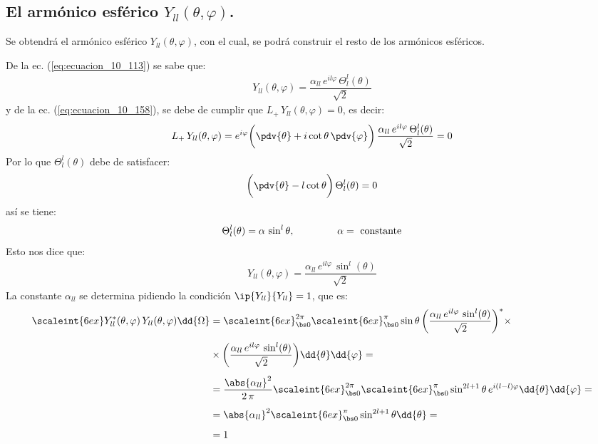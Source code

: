 \subsection{El armónico esférico \texorpdfstring{$Y_{ll} (\theta, \varphi)$}{Yll (t, f)}.}

Se obtendrá el armónico esférico $Y_{ll} (\theta, \varphi)$, con el cual, se podrá construir el resto de los armónicos esféricos.
\par
De la ec. (\ref{eq:ecuacion_10_113}) se sabe que:
\begin{align}
Y_{l l} (\theta, \varphi) = \dfrac{\alpha_{l l} \, e^{i l \varphi} \, \Theta_{l}^{l} (\theta)}{\sqrt{2}}
\label{eq:ecuacion_10_161}
\end{align}
y de la ec. (\ref{eq:ecuacion_10_158}), se debe de cumplir que $L_{+} \, Y_{l l} (\theta, \varphi) = 0$, es decir:
\begin{align}
L_{+} \, Y_{l l} (\theta, \varphi) = e^{i \varphi} \bigg( \pdv{\theta} + i \cot \theta \, \pdv{\varphi} \bigg) \, \dfrac{\alpha_{l l} \, e^{i l \varphi} \, \Theta_{l}^{l} (\theta)}{\sqrt{2}} = 0
\label{eq:ecuacion_10_162}
\end{align}
Por lo que $\Theta_{l}^{l} (\theta)$ debe de satisfacer:
\begin{align}
\bigg( \pdv{\theta} - l \cot \theta \bigg) \, \Theta_{l}^{l} (\theta) = 0
\label{eq:ecuacion_10_163}
\end{align}
así se tiene:
\begin{align}
\Theta_{l}^{l} (\theta) = \alpha \, \sin^{l} \theta, \hspace{1.5cm} \alpha = \mbox{ constante}
\label{eq:ecuacion_10_164}
\end{align}
Esto nos dice que:
\begin{align}
Y_{l l} (\theta, \varphi) = \dfrac{\alpha_{l l} \, e^{i l \varphi} \, \sin^{l} (\theta)}{\sqrt{2}}
\label{eq:ecuacion_10_165}
\end{align}
La constante $\alpha_{l l}$ se determina pidiendo la condición $\ip{Y_{l l}}{Y_{l l}} = 1$, que es:
\begin{align*}
\scaleint{6ex} Y_{ll}^{*} (\theta, \varphi) \, Y_{ll} (\theta, \varphi) \dd{\Omega} &= \scaleint{6ex}_{\bs 0}^{2 \pi} \scaleint{6ex}_{\bs 0}^{\pi} \sin \theta \, \bigg( \dfrac{\alpha_{l l} \, e^{i l \varphi} \, \sin^{l} (\theta)}{\sqrt{2}} \bigg)^{*} \times \\[0.5em]
&\times \bigg( \dfrac{\alpha_{l l} \, e^{i l \varphi} \, \sin^{l} (\theta)}{\sqrt{2}} \bigg) \dd{\theta} \dd{\varphi} = \\[0.5em]
&= \dfrac{\abs{\alpha_{ll}}^{2}}{2 \, \pi} \scaleint{6ex}_{\bs 0}^{2 \pi} \scaleint{6ex}_{\bs 0}^{\pi} \sin^{2l+1} \theta \, e^{i(l-l) \varphi} \dd{\theta} \dd{\varphi} = \\[0.5em]
&= \abs{\alpha_{ll}}^{2} \scaleint{6ex}_{\bs 0}^{\pi} \sin^{2l+1} \theta \dd{\theta} = \\[0.5em]
&= 1
\end{align*}
